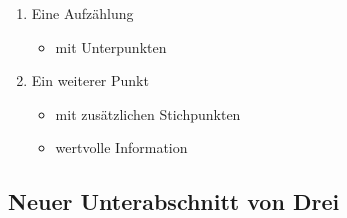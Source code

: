 \begin{enumerate}
\item Eine Aufzählung
  \begin{itemize}
  \item mit Unterpunkten
  \end{itemize}
\item Ein weiterer Punkt
  \begin{itemize}
  \item mit zusätzlichen Stichpunkten
  \item wertvolle Information
  \end{itemize}
\end{enumerate}

\subsection{Neuer Unterabschnitt von Drei}\label{hauptabschnitt3.2}

\Blindtext
